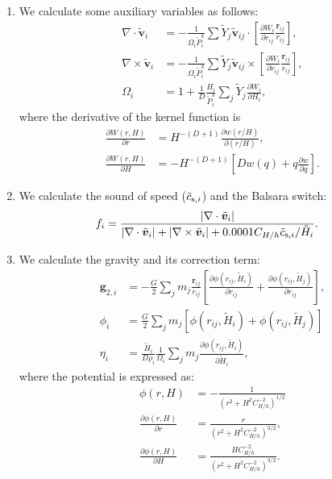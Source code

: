 \documentclass[fleqn,dvipdfmx]{article}
\begin{document}
\begin{enumerate}
\item We calculate some auxiliary variables as follows:
  \begin{align}
    \nabla \cdot \tilde{\bm{v}}_i &= - \frac{1}{\Omega_i
      \tilde{P}_i^k} \sum \tilde{Y}_j \tilde{\bm{v}}_{ij} \cdot
    \left[\frac{\partial W_i}{\partial r_{ij}}
      \frac{\bm{r}_{ij}}{r_{ij}} \right], \\
    \nabla \times \tilde{\bm{v}}_i &= - \frac{1}{\Omega_i
      \tilde{P}_i^k} \sum \tilde{Y}_j \tilde{\bm{v}}_{ij} \times
    \left[\frac{\partial W_i}{\partial r_{ij}}
      \frac{\bm{r}_{ij}}{r_{ij}} \right], \\
    \Omega_i &= 1 + \frac{1}{D} \frac{H_i}{\tilde{P}_i^k} \sum_j
    \tilde{Y}_j \frac{\partial W_i}{\partial H_i},
  \end{align}
  where the derivative of the kernel function is
  \begin{align}
    \frac{\partial W(r,H)}{\partial r} &= H^{-(D+1)} \frac{\partial
      w(r/H)}{\partial (r/H)}, \\
      \frac{\partial W(r,H)}{\partial H} &= -H^{-(D+1)} \left[ D w(q)
        + q \frac{\partial w}{\partial q} \right].
  \end{align}

\item We calculate the sound of speed ($\tilde{c}_{{\rm s},i}$) and
  the Balsara switch:
  \begin{align}
    f_i &= \frac{|\nabla \cdot \tilde{\bm{v}}_i|}{|\nabla \cdot
      \tilde{\bm{v}}_i| + |\nabla \times \tilde{\bm{v}}_i| + 0.0001
      C_{H/h} \tilde{c}_{{\rm s},i} / \tilde{H}_i}.
  \end{align}

\item We calculate the gravity and its correction term:
  \begin{align}
    \bm{g}_{2,i} &= - \frac{G}{2} \sum_j m_j
    \frac{\bm{r}_{ij}}{r_{ij}} \left[ \frac{\partial
        \phi(r_{ij},\tilde{H}_i)}{\partial r_{ij}} + \frac{\partial
        \phi(r_{ij},\tilde{H}_j)}{\partial r_{ij}} \right], \\
    \phi_i &= \frac{G}{2} \sum_j m_j \left[ \phi(r_{ij},\tilde{H}_i) +
      \phi(r_{ij},\tilde{H}_j) \right] \\
    \eta_i &= \frac{\tilde{H}_i}{D\rho_i} \frac{1}{\Omega_i} \sum_j
    m_j \frac{\partial \phi(r_{ij},\tilde{H}_i)}{\partial
      \tilde{H}_i},
  \end{align}
  where the potential is expressed as:
  \begin{align}
    \phi(r,H) &= - \frac{1}{\left( r^2 + H^2 C_{H/h}^{-2}
      \right)^{1/2}} \\
    \frac{\partial \phi(r,H)}{\partial r} &= \frac{r}{\left( r^2 + H^2
      C_{H/h}^{-2} \right)^{3/2}}, \\
    \frac{\partial \phi(r,H)}{\partial H} &=
    \frac{HC_{H/h}^{-2}}{\left( r^2 + H^2 C_{H/h}^{-2} \right)^{3/2}}.
  \end{align}


\end{enumerate}
\end{document}
